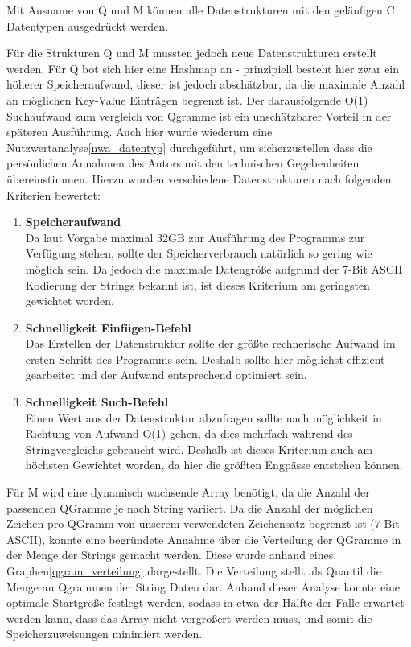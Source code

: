 Mit Ausname von Q und M können alle Datenstrukturen mit den geläufigen C
Datentypen ausgedrückt werden.

Für die Strukturen Q und M mussten jedoch neue Datenstrukturen
erstellt werden. Für Q bot sich hier eine Hashmap an - prinzipiell besteht
hier zwar ein höherer Speicheraufwand, dieser ist jedoch abschätzbar, da die
maximale Anzahl an möglichen Key-Value Einträgen begrenzt ist. Der darausfolgende
O(1) Suchaufwand zum vergleich von Qgramme ist ein unschätzbarer Vorteil in der
späteren Ausführung. Auch hier wurde wiederum eine Nutzwertanalyse\ref{nwa_datentyp} durchgeführt,
um sicherzustellen dass die persönlichen Annahmen des Autors mit den technischen
Gegebenheiten übereinstimmen.
Hierzu wurden verschiedene Datenstrukturen nach folgenden Kriterien bewertet:

\begin{enumerate}
    \item \textbf{Speicheraufwand} \\
    Da laut Vorgabe maximal 32GB zur Ausführung des Programms zur Verfügung stehen,
    sollte der Speicherverbrauch natürlich so gering wie möglich sein. Da jedoch
    die maximale Datengröße aufgrund der 7-Bit ASCII Kodierung der Strings
    bekannt ist, ist dieses Kriterium am geringsten gewichtet worden.\par
    \item \textbf{Schnelligkeit Einfügen-Befehl} \\
    Das Erstellen der Datenstruktur sollte der größte rechnerische Aufwand im
    ersten Schritt des Programms sein. Deshalb sollte hier möglichst effizient gearbeitet und
    der Aufwand entsprechend optimiert sein.\par
    \item \textbf{Schnelligkeit Such-Befehl} \\
    Einen Wert aus der Datenstruktur abzufragen sollte nach möglichkeit in
    Richtung von Aufwand O(1) gehen, da dies mehrfach während des Stringvergleichs
    gebraucht wird. Deshalb ist dieses Kriterium auch am höchsten Gewichtet worden,
    da hier die größten Engpässe entstehen können.\par

\end{enumerate}

Für M wird eine dynamisch wachsende Array benötigt, da die Anzahl der passenden
QGramme je nach String variiert. Da die Anzahl der möglichen Zeichen pro QGramm von unserem
verwendeten Zeichensatz begrenzt ist (7-Bit ASCII), konnte eine begründete Annahme
über die Verteilung der QGramme in der Menge der Strings gemacht werden. Diese wurde anhand eines
Graphen\ref{qgram_verteilung} dargestellt. Die Verteilung stellt als Quantil die 
Menge an Qgrammen der String Daten dar.
Anhand dieser Analyse konnte eine optimale Startgröße festlegt werden, sodass in etwa der Hälfte der Fälle
erwartet werden kann, dass das Array nicht vergrößert werden muss, und somit die
Speicherzuweisungen minimiert werden.

